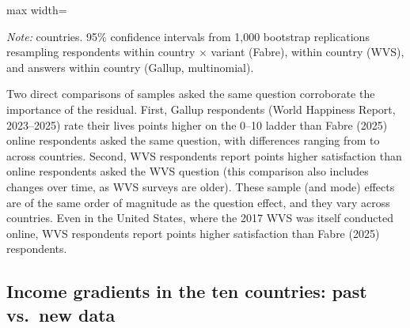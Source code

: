 \documentclass[12pt]{article}
\begin{document}
\begin{table}[htbp]
    \centering
    \caption{Decomposition of the Gallup--WVS gap: summary.}\label{tab:decomposition_summary}
    \begin{adjustbox}{max width=\textwidth}
    
    \end{adjustbox}
    \begin{minipage}{\textwidth}\footnotesize \textit{Note:} \nDecompCountries countries. 95\% confidence intervals from 1,000 bootstrap replications resampling respondents within country $\times$ variant (Fabre), within country (WVS), and answers within country (Gallup, multinomial).\end{minipage}
\end{table} %

Two direct comparisons of samples asked the same question corroborate the importance of the residual. First, Gallup respondents (World Happiness Report, 2023--2025) rate their lives \meanSampleEffectGallup points higher on the 0--10 ladder than Fabre (2025) online respondents asked the same question, with differences ranging from \minSampleEffectGallup to \maxSampleEffectGallup across countries. Second, WVS respondents report \meanSampleEffectWVS points higher satisfaction than online respondents asked the WVS question (this comparison also includes changes over time, as WVS surveys are older). These sample (and mode) effects are of the same order of magnitude as the question effect, and they vary across countries. Even in the United States, where the 2017 WVS was itself conducted online, WVS respondents report \sampleEffectUSWVS points higher satisfaction than Fabre (2025) respondents.

\subsection{Income gradients in the ten countries: past vs.\ new data}\label{subsec:ten_countries}
\end{document}
